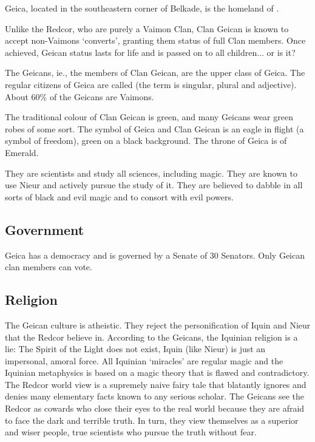 



Geica, located in the southeastern corner of Belkade, is the homeland of . 

Unlike the Redcor, who are purely a Vaimon Clan, Clan Geican is known to accept non-Vaimons `converts', granting them status of full Clan members. Once achieved, Geican status lasts for life and is passed on to all children... or is it? 

The Geicans, ie., the members of Clan Geican, are the upper class of Geica. The regular citizens of Geica are called  (the term is singular, plural and adjective). About 60\% of the Geicans are Vaimons. 

The traditional colour of Clan Geican is green, and many Geicans wear green robes of some sort. The symbol of Geica and Clan Geican is an eagle in flight (a symbol of freedom), green on a black background. The throne of Geica is of Emerald. 

They are scientists and study all sciences, including magic. They are known to use Nieur and actively pursue the study of it. They are believed to dabble in all sorts of black and evil magic and to consort with evil powers. 

\subsection{Government}
Geica has a democracy and is governed by a Senate of 30 Senators. Only Geican clan members can vote. 

\subsection{Religion}
The Geican culture is atheistic. They reject the personification of Iquin and Nieur that the Redcor believe in. According to the Geicans, the Iquinian religion is a lie: The Spirit of the Light does not exist, Iquin (like Nieur) is just an impersonal, amoral force. All Iquinian `miracles' are regular magic and the Iquinian metaphysics is based on a magic theory that is flawed and contradictory. The Redcor world view is a supremely naive fairy tale that blatantly ignores and denies many elementary facts known to any serious scholar. The Geicans see the Redcor as cowards who close their eyes to the real world because they are afraid to face the dark and terrible truth. In turn, they view themselves as a superior and wiser people, true scientists who pursue the truth without fear. 

